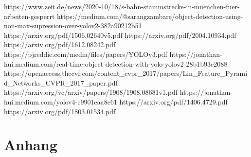 \documentclass[conference]{IEEEtran}
\begin{document}
	\begin{thebibliography}{00}
		https://www.zeit.de/news/2020-10/18/s-bahn-stammstrecke-in-muenchen-fuer-arbeiten-gesperrt
		https://medium.com/@sarangzambare/object-detection-using-non-max-supression-over-yolov2-382a90212b51
		https://arxiv.org/pdf/1506.02640v5.pdf
		https://arxiv.org/pdf/2004.10934.pdf %
		https://arxiv.org/pdf/1612.08242.pdf %
		https://pjreddie.com/media/files/papers/YOLOv3.pdf %
		https://jonathan-hui.medium.com/real-time-object-detection-with-yolo-yolov2-28b1b93e2088 %
		https://openaccess.thecvf.com/content\_cvpr\_2017/papers/Lin\_Feature\_Pyramid\_Networks\_CVPR\_2017\_paper.pdf %
		https://arxiv.org/vc/arxiv/papers/1908/1908.08681v1.pdf%
		https://jonathan-hui.medium.com/yolov4-c9901eaa8e61 %
		https://arxiv.org/pdf/1406.4729.pdf %
		https://arxiv.org/pdf/1803.01534.pdf %
	\end{thebibliography}
	
	\section{Anhang}
	
	
\end{document}

